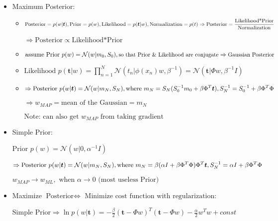 \begin{itemize}
\item Maximum Posterior:
	\begin{itemize}
	\item $\text{Posterior}=p(w|\boldsymbol t), \text{Prior}=p(w), \text{Likelihood} = p(\boldsymbol t|w), \text{Normalization}=p(t) \\ \displaystyle \Rightarrow \text{Posterior}=\frac {\text{Likelihood*Prior}} {\text{Normalization}}$ 
	
	$\Rightarrow \text{Posterior} \propto \text{Likelihood*Prior} $  
	
	\item $\text{assume Prior } \displaystyle p(w) =  \mathcal{N}(w|m_0,S_0), \\ \small \text{so that Prior \& Likelihood are conjugate} \Rightarrow \text{Gaussian Posterior}$ 
	
	\item $\text{Likelihood } \displaystyle p(\boldsymbol t|w) = \prod_{n=1}^N\mathcal N(t_n|\phi(x_n)w,\beta^{-1}) =\mathcal N(\boldsymbol t|\Phi w,\beta^{-1}I )$ 
	
	\item $\Rightarrow \text{Posterior } \displaystyle p(w|\boldsymbol t) = \mathcal N(w|m_N,S_N),\\ \text{where } m_N=S_N(S_0^{-1}m_0+\beta\Phi^T \boldsymbol t),\space S_N^{-1}=S_0^{-1} + \beta \Phi^T\Phi$ 
	
	$\Rightarrow w_{MAP} = \text{mean of the Gaussian} = m_N$ 
	
		$\text{Note: can also get } w_{MAP} \text{ from taking gradient}$ 
	\end{itemize}

\item Simple Prior:

$\text{Prior } p(w)=\mathcal N(w|0,\alpha^{-1}I)$ 

$\Rightarrow \text{Posterior } \displaystyle p(w|\boldsymbol t) = \mathcal N(w|m_N,S_N),\\ \text{where } \displaystyle m_N=\beta(\alpha I + \beta \Phi^T\Phi)\Phi^T \boldsymbol t,\space S_N^{-1}=\alpha I + \beta \Phi^T\Phi$ 

$ w_{MAP} \rightarrow w_{ML}, \text{ when }\alpha \rightarrow 0 \text{ (most useless Prior)}$ 

\item Maximize $\text{Posterior} \Leftrightarrow$ Minimize $\text{cost function with regularization}$: 

	$ \text{Simple Prior} \Rightarrow \displaystyle \ln p(w|\boldsymbol t) = -\frac \beta 2 (\boldsymbol t-\Phi w)^T (\boldsymbol t-\Phi w)-\frac \alpha 2 w^Tw+const$ 


\end{itemize}
